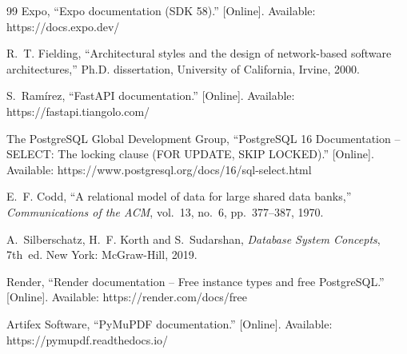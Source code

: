 \begin{thebibliography}{99}
Expo, ``Expo documentation (SDK 58).'' [Online]. Available: https://docs.expo.dev/

R.~T. Fielding, ``Architectural styles and the design of network-based software architectures,''
Ph.D. dissertation, University of California, Irvine, 2000.

S.~Ram\'irez, ``FastAPI documentation.'' [Online]. Available: https://fastapi.tiangolo.com/

The PostgreSQL Global Development Group, ``PostgreSQL 16 Documentation -- SELECT: The locking
clause (FOR UPDATE, SKIP LOCKED).'' [Online]. Available: https://www.postgresql.org/docs/16/sql-select.html

E.~F. Codd, ``A relational model of data for large shared data banks,'' \emph{Communications of the
ACM}, vol.~13, no.~6, pp.~377--387, 1970.

A.~Silberschatz, H.~F. Korth and S.~Sudarshan, \emph{Database System Concepts}, 7th~ed.
New York: McGraw-Hill, 2019.

Render, ``Render documentation -- Free instance types and free PostgreSQL.'' [Online]. Available:
https://render.com/docs/free

Artifex Software, ``PyMuPDF documentation.'' [Online]. Available: https://pymupdf.readthedocs.io/

\end{thebibliography}
